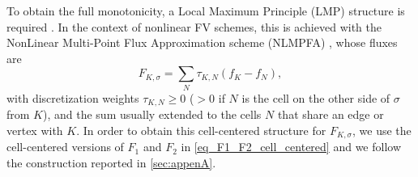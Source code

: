 \documentclass[final,11pt]{elsarticle}
\begin{document}
To obtain the full monotonicity, a Local Maximum Principle (LMP) structure is required \cite{DLP10}. In the context of nonlinear FV schemes, this is achieved with the NonLinear Multi-Point Flux Approximation scheme (NLMPFA) \cite{DLP10,droniou2014,schneider2018,sheng2011,cances2013}, whose fluxes are
\begin{equation}
    F_{K,\sigma}=\sum_{N}\tau_{K,N}(f_K-f_N),
    \label{eq_NLMPFA}
\end{equation}
with discretization weights $\tau_{K,N}\ge 0$ ($>0$ if $N$ is the cell on the other side of $\sigma$ from $K$), and the sum usually extended to the cells $N$ that share an edge or vertex with $K$. In order to obtain this cell-centered structure for $F_{K,\sigma}$, we use the cell-centered versions of $F_1$ and $F_2$ in \eqref{eq_F1_F2_cell_centered} and we follow the construction reported in \ref{sec:appenA}.
\end{document}
